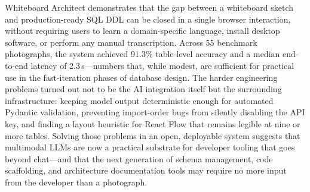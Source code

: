 \documentclass[conference]{IEEEtran}
\begin{document}
Whiteboard Architect demonstrates that the gap between a whiteboard
sketch and production-ready SQL DDL can be closed in a single
browser interaction, without requiring users to learn a domain-specific
language, install desktop software, or perform any manual
transcription. Across 55 benchmark photographs, the system achieved
91.3\% table-level accuracy and a median end-to-end latency of
2.3\,s---numbers that, while modest, are sufficient for practical
use in the fast-iteration phases of database design. The harder
engineering problems turned out not to be the AI integration itself
but the surrounding infrastructure: keeping model output deterministic
enough for automated Pydantic validation, preventing import-order
bugs from silently disabling the API key, and finding a layout
heuristic for React Flow that remains legible at nine or more tables.
Solving those problems in an open, deployable system suggests that
multimodal LLMs are now a practical substrate for developer tooling
that goes beyond chat---and that the next generation of schema
management, code scaffolding, and architecture documentation tools
may require no more input from the developer than a photograph.
\end{document}
